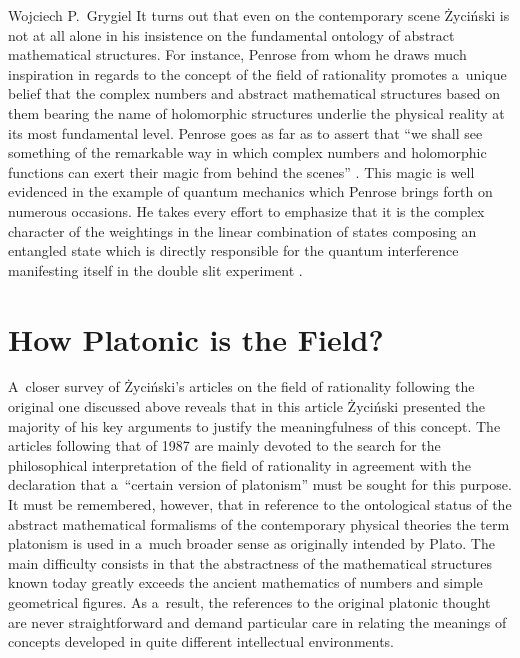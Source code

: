\begin{artengenv}{Wojciech P.~Grygiel}
It turns out that even on the contemporary scene Życiński is not at all alone in his insistence on the fundamental ontology of abstract mathematical structures. For instance, Penrose from whom he draws much inspiration in regards to the concept of the field of rationality promotes a~unique belief that the complex numbers and abstract mathematical structures based on them bearing the name of holomorphic structures underlie the physical reality at its most fundamental level. Penrose goes as far as to assert that ``we shall see something of the remarkable way in which complex numbers and holomorphic functions can exert their magic from behind the scenes''
\parencite[][p.151]{penrose_road_2005}. %
 This magic is well evidenced in the example of quantum mechanics which Penrose brings forth on numerous occasions. He takes every effort to emphasize that it is the complex character of the weightings in the linear combination of states composing an entangled state which is directly responsible for the quantum interference manifesting itself in the double slit experiment 
\parencites[][pp.236–242]{penrose_emperors_1989}[][pp.50–92]{penrose_large_1997}[][pp.553–559]{penrose_road_2005}.%


\section{How Platonic is the Field?}
A~closer survey of Życiński's articles on the field of rationality following the original one discussed above
\parencite[][]{zycinski_filozoficzne_1987} %
 reveals that in this article Życiński presented the majority of his key arguments to justify the meaningfulness of this concept. The articles following that of 1987 are mainly devoted to the search for the philosophical interpretation of the field of rationality in agreement with the declaration that a~``certain version of platonism'' must be sought for this purpose. It must be remembered, however, that in reference to the ontological status of the abstract mathematical formalisms of the contemporary physical theories the term platonism is used in a~much broader sense as originally intended by Plato. The main difficulty consists in that the abstractness of the mathematical structures known today greatly exceeds the ancient mathematics of numbers and simple geometrical figures. As a~result, the references to the original platonic thought are never straightforward and demand particular care in relating the meanings of concepts developed in quite different intellectual environments.


\end{artengenv}
